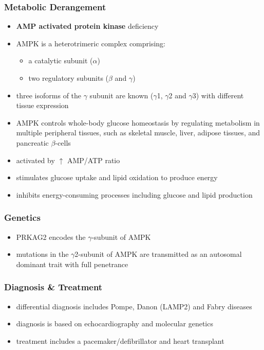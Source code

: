 \documentclass[12pt]{scrartcl}
\begin{document}
\subsubsection{Metabolic Derangement}
\label{sec:org6dbc874}
\begin{itemize}
\item \textbf{AMP activated protein kinase} deficiency
\item AMPK is a heterotrimeric complex comprising:
\begin{itemize}
\item a catalytic subunit (\(\alpha\))
\item two regulatory subunits (\(\beta\) and \(\gamma\))
\end{itemize}
\item three isoforms of the \(\gamma\) subunit are known (\(\gamma\)1, \(\gamma\)2 and \(\gamma\)3) with different tissue
expression
\item AMPK controls whole-body glucose homeostasis by regulating metabolism in multiple peripheral tissues, such as
skeletal muscle, liver, adipose tissues, and pancreatic \(\beta\)-cells
\item activated by \(\uparrow\) AMP/ATP ratio
\item stimulates glucose uptake and lipid oxidation to produce energy
\item inhibits energy-consuming processes including glucose and lipid production
\end{itemize}
\subsubsection{Genetics}
\label{sec:orgd7969ec}
\begin{itemize}
\item PRKAG2 encodes the \(\gamma\)-subunit of AMPK
\item mutations in the \(\gamma\)2-subunit of AMPK are transmitted as an
autosomal dominant trait with full penetrance
\end{itemize}

\subsubsection{Diagnosis \& Treatment}
\label{sec:org009d153}
\begin{itemize}
\item differential diagnosis includes Pompe, Danon (LAMP2) and Fabry diseases
\item diagnosis is based on echocardiography and molecular genetics
\item treatment includes a pacemaker/defibrillator and heart transplant
\end{itemize}
\end{document}
